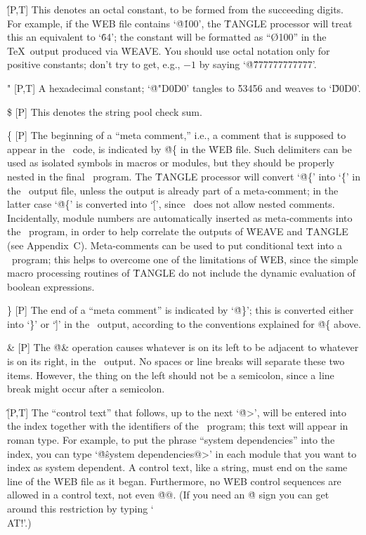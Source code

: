 \@\' [P,T] This denotes an octal constant, to be formed from the
succeeding digits. For example, if the \.{WEB} file contains `\.{@\'100}',
the \.{TANGLE} processor will treat this an equivalent to `\.{64}';
the constant will be formatted as ``\O{100}'' in the \TeX\ output
produced via \.{WEAVE}. You should use octal notation only for positive
constants; don't try to get, e.g., $-1$ by saying `\.{@\'777777777777}'.

\@" [P,T] A hexadecimal constant; `\.{@"D0D0}' tangles to \.{53456} and
weaves to `\H{D0D0}'.

\@\$ [P] This denotes the string pool check sum.

\@\{ [P] The beginning of a ``meta comment,'' i.e., a comment
that is supposed to appear in the \PASCAL\ code, is indicated by
\.{@\{} in the \.{WEB} file. Such delimiters can be used as
isolated symbols in macros or modules, but they should be properly nested
in the final \PASCAL\ program. The \.{TANGLE} processor will convert
`\.{@\{}' into `\.\{' in the \PASCAL\ output file, unless
the output is already part of a meta-comment; in the latter case
`\.{@\{}' is converted into `\.[', since \PASCAL\ does not allow
nested comments. Incidentally, module numbers are automatically inserted
as meta-comments into the \PASCAL\ program, in order to help correlate the
outputs of \.{WEAVE} and \.{TANGLE} (see Appendix~C\null). Meta-comments
can be used to put conditional text into a \PASCAL\ program; this helps to
overcome one of the limitations of \.{WEB}, since the simple macro
processing routines of \.{TANGLE} do not include the dynamic evaluation of
boolean expressions.

\@\} [P] The end of a ``meta comment'' is indicated by `\.{@\}}'; this is
converted either into `\.\}' or `\.{]}' in the \PASCAL\ output, according
to the conventions explained for \.{@\{} above.

\@\& [P] The \.{@\&} operation causes whatever is on its left to be
adjacent to whatever is on its right, in the \PASCAL\ output. No spaces or
line breaks will separate these two items. However, the thing on the left
should not be a semicolon, since a line break might occur after a semicolon.

\@\^ [P,T] The ``control text'' that follows, up to the next
`\.{@>}', will be entered into the index together with the identifiers of
the \PASCAL\ program; this text will appear in roman type. For example, to
put the phrase ``system dependencies'' into the index, you can type
`\.{@\^system dependencies@>}' in each module
that you want to index as system dependent. A control text, like a string,
must end on the same line of the \.{WEB} file as it began.  Furthermore,
no \.{WEB} control sequences are allowed in a control text, not even
\.{@@}. (If you need an \.{@} sign you can get around this restriction by
typing `\.{\\AT!}'.)

